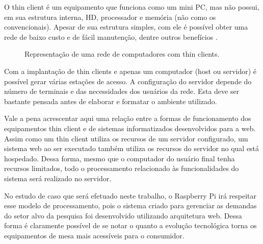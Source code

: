 O thin client é um equipamento que funciona como um mini PC, mas não possui, em sua estrutura interna, HD, processador e memória (não como os convencionais). Apesar de sua estrutura simples, com ele é possível obter uma rede de baixo custo e de fácil manutenção, dentre outros benefícios \cite{THINCLIENT}.

\begin{figure}[ht]
    \centering
    \caption{Representação de uma rede de computadores com thin clients.}
\end{figure}

Com a implantação de thin clients e apenas um computador (host ou servidor) é possível gerar várias estações de acesso. A configuração do servidor depende do número de terminais e das necessidades dos usuários da rede. Esta deve ser bastante pensada antes de elaborar e formatar o ambiente utilizado.

Vale a pena acrescentar aqui uma relação entre a formas de funcionamento dos equipamentos thin client e de sistemas informatizados desenvolvidos para a web. Assim como um thin client utiliza os recursos de um servidor configurado, um sistema web ao ser executado também utiliza os recursos do servidor no qual está hospedado. Dessa forma, mesmo que o computador do usuário final tenha recursos limitados, todo o processamento relacionado às funcionalidades do sistema será realizado no servidor.

No estudo de caso que será efetuado neste trabalho, o Raspberry Pi irá respeitar esse modelo de processamento, pois o sistema criado para gerenciar as demandas do setor alvo da pesquisa foi desenvolvido utilizando arquitetura web. Dessa forma é claramente possível de se notar o quanto a evolução tecnológica torna os equipamentos de mesa mais acessíveis para o consumidor.

